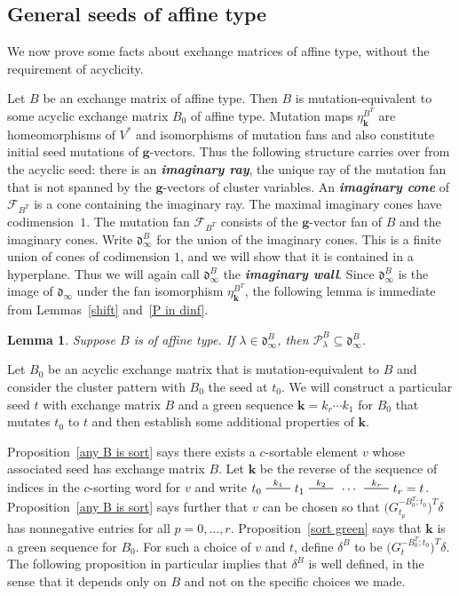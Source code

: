 \documentclass[10pt]{article}
\newtheorem{lemma}[proposition]{Lemma}
\theoremstyle{definition}
\theoremstyle{remark}
\numberwithin{equation}{section}
\newcommand{\newword}[1]{\textbf{\emph{#1}}}
\newcommand{\edge}{\,\,\rule[2.7pt]{20pt}{0.5pt}\,\,}
\newcommand{\F}{{\mathcal F}}
\newcommand{\0}{{\mathbf{0}}}
\newcommand{\g}{\mathbf{g}}
\newcommand{\kk}{{\boldsymbol{k}}}
\renewcommand{\P}{\mathcal{P}}
\renewcommand{\d}{{\mathfrak d}}
\begin{document}
\subsection{General seeds of affine type}
We now prove some facts about exchange matrices of affine type, without the requirement of acyclicity.

Let $B$ be an exchange matrix of affine type.
Then $B$ is mutation-equivalent to some acyclic exchange matrix $B_0$ of affine type.
Mutation maps $\eta_\kk^{B^T}$ are homeomorphisms of $V^*$ and isomorphisms of mutation fans and also constitute initial seed mutations of $\g$-vectors.
Thus the following structure carries over from the acyclic seed:
there is an \newword{imaginary ray}, the unique ray of the mutation fan that is not spanned by the $\g$-vectors of cluster variables.
An \newword{imaginary cone} of $\F_{B^T}$ is a cone containing the imaginary ray.
The maximal imaginary cones have codimension~$1$.
The mutation fan $\F_{B^T}$ consists of the $\g$-vector fan of $B$ and the imaginary cones.
Write $\d^B_\infty$ for the union of the imaginary cones.
This is a finite union of cones of codimension $1$, and we will show that it is contained in a hyperplane.
Thus we will again call $\d^B_\infty$ the \newword{imaginary wall}.
Since $\d^B_\infty$ is the image of $\d_\infty$ under the fan isomorphism $\eta_\kk^{B^T}$, the following lemma is immediate from Lemmas~\ref{shift} and~\ref{P in dinf}.

\begin{lemma}\label{P in dBinf}
Suppose $B$ is of affine type.
If $\lambda\in\d^B_\infty$, then $\P^B_\lambda\subseteq\d^B_\infty$.
\end{lemma}

Let $B_0$ be an acyclic exchange matrix that is mutation-equivalent to $B$ and consider the cluster pattern with $B_0$ the seed at $t_0$.
We will construct a particular seed $t$ with exchange matrix $B$ and a green sequence $\kk=k_r\cdots k_1$ for $B_0$ that mutates $t_0$ to $t$ and then establish some additional properties of $\kk$.

Proposition~\ref{any B is sort} says there exists a $c$-sortable element $v$ whose associated seed has exchange matrix $B$.
Let $\kk$ be the reverse of the sequence of indices in the $c$-sorting word for $v$ and write $t_0\overset{k_1}{\edge}t_1\overset{k_2}{\edge}\,\cdots\,\overset{k_r}{\edge}t_r=t$.
Proposition~\ref{any B is sort} says further that $v$ can be chosen so that $\bigl(G_{t_p}^{-B_0^T;t_0}\bigr)^T\delta$ has nonnegative entries for all $p=0,\ldots,r$.
Proposition~\ref{sort green} says that $\kk$ is a green sequence for $B_0$.
For such a choice of $v$ and $t$, define $\delta^B$ to be $\bigl(G_t^{-B_0^T;t_0}\bigr)^T\delta$.  The following proposition in particular implies that $\delta^B$ is well defined, in the sense that it depends only on $B$ and not on the specific choices we made.
\end{document}
